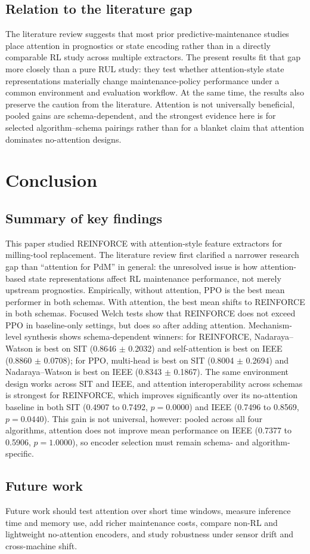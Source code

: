 \subsection{Relation to the literature gap}
The literature review suggests that most prior predictive-maintenance studies place attention in prognostics or state encoding rather than in a directly comparable RL study across multiple extractors. The present results fit that gap more closely than a pure RUL study: they test whether attention-style state representations materially change maintenance-policy performance under a common environment and evaluation workflow. At the same time, the results also preserve the caution from the literature. Attention is not universally beneficial, pooled gains are schema-dependent, and the strongest evidence here is for selected algorithm--schema pairings rather than for a blanket claim that attention dominates no-attention designs.

\section{Conclusion} \label{sec:conclusion} %

\subsection{Summary of key findings}
This paper studied \textsc{REINFORCE} with attention-style feature extractors for milling-tool replacement. The literature review first clarified a narrower research gap than ``attention for PdM'' in general: the unresolved issue is how attention-based state representations affect RL maintenance performance, not merely upstream prognostics. Empirically, without attention, \textsc{PPO} is the best mean performer in both schemas. With attention, the best mean shifts to \textsc{REINFORCE} in both schemas. Focused Welch tests show that \textsc{REINFORCE} does not exceed \textsc{PPO} in baseline-only settings, but does so after adding attention. Mechanism-level synthesis shows schema-dependent winners: for \textsc{REINFORCE}, Nadaraya--Watson is best on SIT (0.8646 $\pm$ 0.2032) and self-attention is best on IEEE (0.8860 $\pm$ 0.0708); for \textsc{PPO}, multi-head is best on SIT (0.8004 $\pm$ 0.2694) and Nadaraya--Watson is best on IEEE (0.8343 $\pm$ 0.1867). The same environment design works across SIT and IEEE, and attention interoperability across schemas is strongest for \textsc{REINFORCE}, which improves significantly over its no-attention baseline in both SIT (0.4907 to 0.7492, $p=0.0000$) and IEEE (0.7496 to 0.8569, $p=0.0440$). This gain is not universal, however: pooled across all four algorithms, attention does not improve mean performance on IEEE (0.7377 to 0.5906, $p=1.0000$), so encoder selection must remain schema- and algorithm-specific.

\subsection{Future work}
Future work should test attention over short time windows, measure inference time and memory use, add richer maintenance costs, compare non-RL and lightweight no-attention encoders, and study robustness under sensor drift and cross-machine shift.

